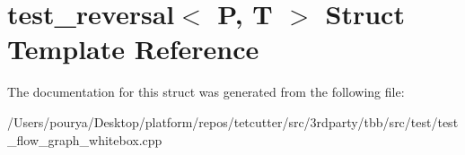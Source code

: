 \hypertarget{structtest__reversal}{}\section{test\+\_\+reversal$<$ P, T $>$ Struct Template Reference}
\label{structtest__reversal}


The documentation for this struct was generated from the following file\+:\begin{DoxyCompactItemize}
\item 
/\+Users/pourya/\+Desktop/platform/repos/tetcutter/src/3rdparty/tbb/src/test/test\+\_\+flow\+\_\+graph\+\_\+whitebox.\+cpp\end{DoxyCompactItemize}
